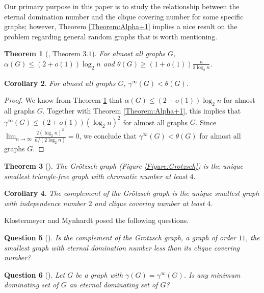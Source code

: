 \documentclass[11pt]{article}
\newtheorem{thm}{Theorem}
\newtheorem{que}[thm]{Question}
\newtheorem{cor}[thm]{Corollary}
\begin{document}
	Our primary purpose in this paper is to study the relationship between the eternal domination number and the clique covering number for some specific graphs; however, Theorem \ref{Theorem:Alpha+1} implies a nice result on the problem regarding general random graphs that is worth mentioning.
	
	\begin{thm} [\cite{alon1992probabilistic}, Theorem $3.1$] \label{Theorem:RandomGraphs}
		For almost all graphs $G$, $\alpha(G) \leq (2+o(1)) \log_2 n$ and $\theta(G) \geq (1+o(1)) \frac{n}{2 \log_2 n}$.
	\end{thm}

	\begin{cor}
		For almost all graphs $G$, $\gamma^\infty(G) < \theta(G)$.
	\end{cor}

	\begin{proof}
		We know from Theorem \ref{Theorem:RandomGraphs} that $\alpha(G) \leq (2+o(1)) \log_2 n$ for almost all graphs $G$. Together with Theorem \ref{Theorem:Alpha+1}, this implies that $\gamma^\infty(G) \leq (2+o(1)) (\log_2 n)^2 $ for almost all graphs $G$. Since $\lim_{n \to \infty} \frac{2 (\log_2 n)^2}{n/(2 \log_2 n)} =0$, we conclude that $\gamma^\infty(G)<\theta(G)$ for almost all graphs $G$.
	\end{proof}
	
	\begin{thm} [\cite{chvatal1974minimality}]
		The Grötzsch graph (Figure \ref{Figure:Grotzsch}) is the unique smallest triangle-free graph with chromatic number at least $4$.
	\end{thm}

	\begin{cor}
		The complement of the Grötzsch graph is the unique smallest graph with independence number $2$ and clique covering number at least $4$.
	\end{cor}

	Klostermeyer and Mynhardt \cite{klostermeyer2016protecting, klostermeyer2020eternal} posed the following questions.

	\begin{que} [\cite{klostermeyer2016protecting}] \label{Question:Smallest}
		Is the complement of the Grötzsch graph, a graph of order $11$, the smallest graph with eternal domination number less than its clique covering number?
	\end{que}

	\begin{que} [\cite{klostermeyer2020eternal}] \label{Question:GammaSets}
		Let $G$ be a graph with $\gamma(G)=\gamma^\infty(G)$. Is any minimum dominating set of $G$ an eternal dominating set of $G$?
	\end{que}
\end{document}
